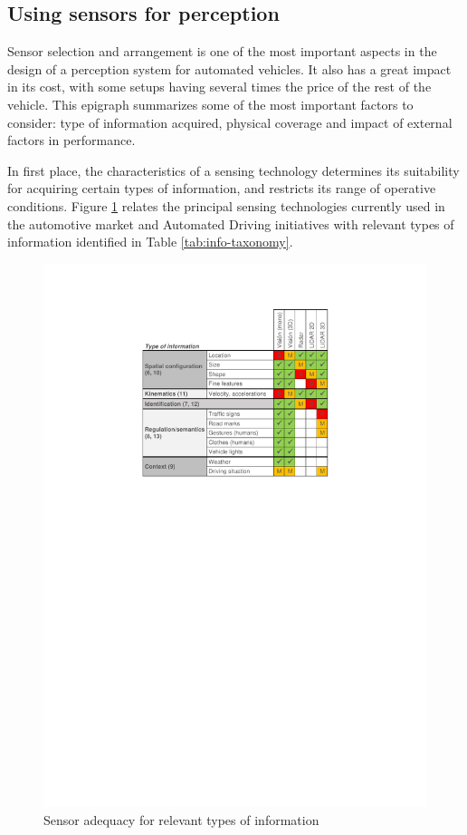 \subsection{Using sensors for perception}
\label{sec:03-e-sensors-for-perception}

Sensor selection and arrangement is one of the most important aspects in the 
design of a perception system for automated vehicles. It also has a great impact
in its cost, with some setups having several times the price of the rest of 
the vehicle. 
This epigraph summarizes some of the most important factors to consider: type 
of information acquired, physical coverage and impact of external factors in 
performance.

In first place, the characteristics of a sensing technology determines its 
suitability for acquiring certain types of information, and restricts its range 
of operative conditions.
Figure \ref{fig:information_vs_sensors} relates the principal sensing 
technologies currently used in the automotive market and Automated Driving
initiatives with relevant types of information identified in Table 
\ref{tab:info-taxonomy}.

\begin{figure}[h]
    \centering
    \includegraphics[width=0.95\linewidth]{"img/information_types_sensors"}
    \caption{Sensor adequacy for relevant types of information}
    \label{fig:information_vs_sensors}
\end{figure}

